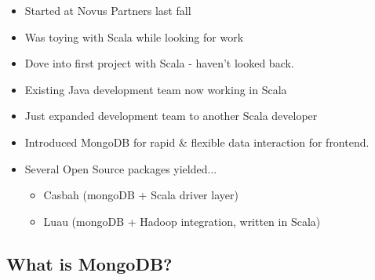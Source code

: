 \documentclass{beamer}
\newenvironment{itemizeframe}
               {\begin{frame}\startitemizeframe} 
               {\stopitemizeframe\end{frame}}
\newcommand\startitemizeframe{\begin{itemize}} \newcommand\stopitemizeframe{\end{itemize}}
\begin{document}
\begin{itemizeframe}
\frametitle{Current Gig}
    \item Started at Novus Partners last fall
    \item Was toying with Scala while looking for work
    \item Dove into first project with Scala - haven't looked back.
    \item Existing Java development team now working in Scala
    \item Just expanded development team to another Scala developer
    \item Introduced MongoDB for rapid \& flexible data interaction for frontend.
    \item Several Open Source packages yielded...
        \begin{itemize}
            \item Casbah (mongoDB + Scala driver layer)
            \item Luau (mongoDB + Hadoop integration, written in Scala)
        \end{itemize}
\end{itemizeframe}

\subsection{What is MongoDB?}
\end{document}

